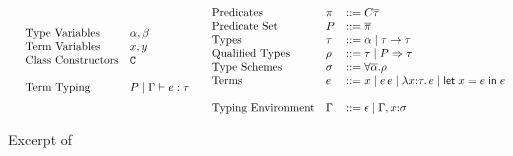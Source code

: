 \documentclass[format=acmsmall,manuscript,review,screen,nonacm,margin=1in,11pt]{acmart}
\begin{document}
\begin{figure}[ht]
    \footnotesize
  \[
  \begin{array}{l l l}
    &\text{Type Variables}     &\alpha, \beta\\
    &\text{Term Variables}     &x, y\\
    &\text{Class Constructors} &\ClassCtrs\\
    \\
    &\text{Term Typing}        &\QTyping \Preds \TEnv \Tm \tau\\
  \end{array}
  \begin{array}{l l l l}
    &\text{Predicates}      &\pi &\bnfeq C\many{\tau}\\
    &\text{Predicate Set}   &\Preds &\bnfeq \many\pi\\
    &\text{Types}           &\tau   &\bnfeq \alpha \bnfor \tau\to\tau\\%
    &\text{Qualified Types} &\rho   &\bnfeq \tau \bnfor \Preds\then\tau\\
    &\text{Type Schemes}    &\sigma &\bnfeq \forall{\many\alpha}.\rho\\
    &\text{Terms}           &\Tm    &\bnfeq x \bnfor \Tm\App \Tm \bnfor \Lam x\tau \Tm \bnfor \Let x {\Tm} {\Tm}\\
    \\
    &\text{Typing Environment} &\TEnv &\bnfeq \empt \bnfor \TEnv,x\co\sigma
  \end{array}
  \]
  \caption[\TCFD Excerpt]{Excerpt of \TCFD}
  \label{fig:ty-fd-formal}
\end{figure}
\end{document}
